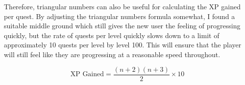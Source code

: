 Therefore, triangular numbers can also be useful for calculating the XP gained per quest. By adjusting the triangular numbers formula somewhat, I found a suitable middle ground which still gives the new user the feeling of progressing quickly, but the rate of quests per level quickly slows down to a limit of approximately 10 quests per level by level 100.
This will ensure that the player will still feel like they are progressing at a reasonable speed throughout.

\begin{equation} \label{eq:xpgainedtriangular}
	\textrm{XP Gained} = \frac{(n+2)(n+3)}{2} \times 10
\end{equation}


